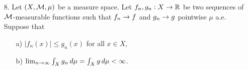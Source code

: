 \begin{itemize}
\begin{itemize}
    \item[b)] Let $f_n:X\rar\bbr$ be a sequence of $\calm$-measurable functions. Suppose that for every $\varepsilon>0$ we have $\sum_{n=1}^\infty \mu(\{x \in X : |f_n(x) - f(x)| \geq \varepsilon\}) > \infty$. Prove that $f_n \rar f$ pointwise $\mu$ a.e.
    
    \item[c)] Let $g_n:X\rar\bbr$ be a sequence of $\calm$-measurable functions. Suppose that $g_n \rar g$ in measure, i.e., for every $\varepsilon>0$ we have $\lim_{n\rar\infty} \mu(\{x \in X : |g_n(x) - g(x)| \geq \varepsilon\}) = 0$. Prove that there exists a subsequence $\{g_{n_k}\}$ such that $g_{n_k} \rar g$ pointwise $\mu$ a.e.
\end{itemize}
 
\begin{proof}
\begin{itemize}
    \item[a)] \hyperref[q:w21-7]{Winter 2021 \#7}; classic Borel-Cantelli! Think of the measure of the $\limsup$ as the tail end of a convergent series.
    
    \item[b)] Let $A_n = \{x \in X : |f_n(x) - f(x)| \geq \varepsilon\}$. By part a) we see $\mu(\mu(\{x \in X : |f_n(x) - f(x)| \geq \varepsilon\})) = 0$.
    
    \item[c)] Suppose $g_n \rar g$ in $\mu$. Let $n_1=1$ and define $n_j > n_{j-1}$ by $A_j = \{|g_{n_j} - g| \geq 1/j\}$ s.t. $\mu(A_j) \leq 2^{-j}$. Define $A = \limsup{A_j}$.

    Then $\mu(A) = 0$ by part a), and for $x \not\in A$ we have $x \not\in \cup_{j=N}^\infty A_j$. That is, $|g_{n_j}(x) - g(x)| \leq 1/j$, so $g_{n_j} \rar g$ on $A^C$.
\end{itemize}
\end{proof}





\item[8.] Let $(X,\mathcal{M},\mu)$ be a measure space. Let $f_n, g_n : X \rightarrow \mathbb{R}$ be two sequences of $\calm$-measurable functions such that $f_n \rar f$ and $g_n \rar g$ pointwise $\mu$ a.e. Suppose that 
\begin{itemize}
    \item[a)] $|f_n(x)| \leq g_n(x)$ for all $x \in X$,
    
    \item[b)] $\lim_{n \rightarrow \infty} \int_{X} g_n \, d\mu = \int_X g \, d\mu < \infty$. 
\end{itemize}


\end{itemize}
